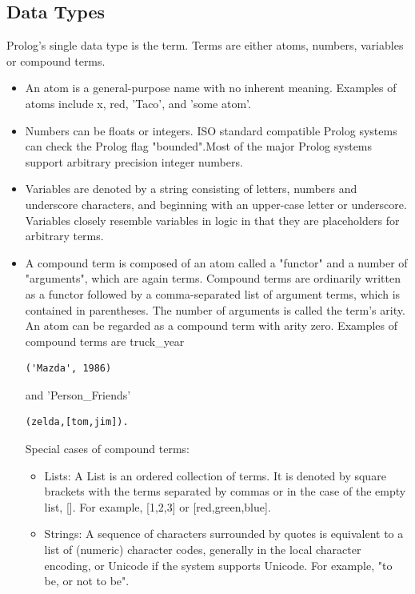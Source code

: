 \documentclass[14pt]{article}
\begin{document}
\subsection{Data Types}
Prolog's single data type is the term. Terms are either atoms, numbers, 
variables or compound terms.
\begin{itemize}
\item An atom is a general-purpose name with no inherent meaning.
Examples of atoms include x, red, 'Taco', and 'some atom'.

\item Numbers can be floats or integers.
ISO standard compatible Prolog systems can check the Prolog flag 
"bounded".Most of the major Prolog systems support arbitrary 
precision integer numbers.

\item Variables are denoted by a string consisting of letters, 
numbers and underscore characters, and beginning with an 
upper-case letter or underscore. Variables closely resemble variables in
logic in that they are placeholders for arbitrary terms.

\item A compound term is composed of an atom called a "functor" and a 
number of "arguments", which are again terms. Compound terms are 
ordinarily written as a functor followed by a comma-separated list of 
argument terms, which is contained in parentheses.
The number of arguments is called the term's arity.
An atom can be regarded as a compound term with arity zero.
Examples of compound terms are truck\_year 
\begin{verbatim}('Mazda', 1986)\end{verbatim} and 
'Person\_Friends' \begin{verbatim}(zelda,[tom,jim]).\end{verbatim}
Special cases of compound terms:
\begin{itemize}
\item Lists: A List is an ordered collection of terms.
It is denoted by square brackets with the terms separated by commas or 
in the case of the empty list, []. For example, [1,2,3] or 
[red,green,blue].

\item Strings: A sequence of characters surrounded by quotes is 
equivalent to a list of (numeric) character codes,
generally in the local character encoding, or Unicode if the system
supports Unicode. For example, "to be, or not to be".
\end{itemize}
\end{itemize}
\end{document}
